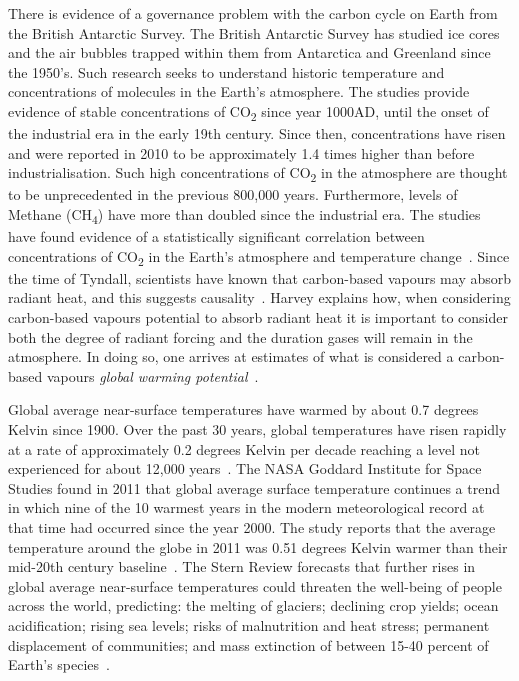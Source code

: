 \documentclass[11pt, oneside]{article}   	%
\begin{document}
There is evidence of a governance problem with the carbon cycle on Earth from the British Antarctic Survey.
The British Antarctic Survey has studied ice cores and the air bubbles trapped within them from Antarctica and Greenland since the 1950’s.
Such research seeks to understand historic temperature and concentrations of molecules in the Earth’s atmosphere.
The studies provide evidence of stable concentrations of CO\textsubscript{2} since year 1000AD, until the onset of the industrial era in the early 19th century.
Since then, concentrations have risen and were reported in 2010 to be approximately 1.4 times higher than before industrialisation.
Such high concentrations of CO\textsubscript{2} in the atmosphere are thought to be unprecedented in the previous 800,000 years. Furthermore, levels of Methane (CH\textsubscript{4}) have more than doubled since the industrial era.
The studies have found evidence of a statistically significant correlation between concentrations of CO\textsubscript{2} in the Earth’s atmosphere and temperature change~\cite{ba1}.
Since the time of Tyndall, scientists have known that carbon-based vapours may absorb radiant heat, and this suggests causality~\cite{td1}.
Harvey explains how, when considering carbon-based vapours potential to absorb radiant heat it is important to consider both the degree of radiant forcing and the duration gases will remain in the atmosphere.
In doing so, one arrives at estimates of what is considered a carbon-based vapours \emph{global warming potential}~\cite{dldh1}.\

Global average near-surface temperatures have warmed by about 0.7 degrees Kelvin since 1900.
Over the past 30 years, global temperatures have risen rapidly at a rate of approximately 0.2 degrees Kelvin per decade reaching a level not experienced for about 12,000 years~\cite{hj1}.
The NASA Goddard Institute for Space Studies found in 2011 that global average surface temperature continues a trend in which nine of the 10 warmest years in the modern meteorological record at that time had occurred since the year 2000.
The study reports that the average temperature around the globe in 2011 was 0.51 degrees Kelvin warmer than their mid-20th century baseline~\cite{candm1}.
The Stern Review forecasts that further rises in global average near-surface temperatures could threaten the well-being of people across the world, predicting: the melting of glaciers; declining crop yields; ocean acidification; rising sea levels; risks of malnutrition and heat stress; permanent displacement of communities; and mass extinction of between 15-40 percent of Earth's species~\cite{ns1}.\
\end{document}
